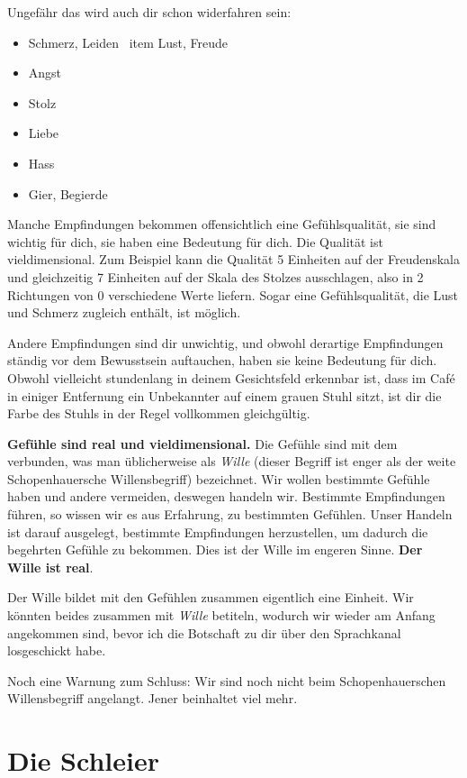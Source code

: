 \documentclass[12pt]{book}
\begin{document}
Ungefähr das wird auch dir schon widerfahren sein:
\begin{itemize}
\item Schmerz, Leiden
\	item Lust, Freude
\item Angst
\item Stolz
\item Liebe
\item Hass
\item Gier, Begierde
\end{itemize}

Manche Empfindungen bekommen offensichtlich eine Gefühlsqualität, sie sind wichtig für dich, sie haben eine Bedeutung für dich. Die Qualität ist vieldimensional. Zum Beispiel kann die Qualität 5 Einheiten auf der Freudenskala und gleichzeitig 7 Einheiten auf der Skala des Stolzes ausschlagen, also in 2 Richtungen von 0 verschiedene Werte liefern. Sogar eine Gefühlsqualität, die Lust und Schmerz zugleich enthält, ist möglich. 

Andere Empfindungen sind dir unwichtig, und obwohl derartige Empfindungen ständig vor dem Bewusstsein auftauchen, haben sie keine Bedeutung für dich. Obwohl vielleicht stundenlang in deinem Gesichtsfeld erkennbar ist, dass im Café in einiger Entfernung ein Unbekannter auf einem grauen Stuhl sitzt, ist dir die Farbe des Stuhls in der Regel vollkommen gleichgültig.

\textbf{Gefühle sind real und vieldimensional.} Die Gefühle sind mit dem verbunden, was man üblicherweise als \textit{Wille} (dieser Begriff ist enger als der weite Schopenhauersche Willensbegriff) bezeichnet. Wir wollen bestimmte Gefühle haben und andere vermeiden, deswegen handeln wir. Bestimmte Empfindungen führen, so wissen wir es aus Erfahrung, zu bestimmten Gefühlen. Unser Handeln ist darauf ausgelegt, bestimmte Empfindungen herzustellen, um dadurch die begehrten Gefühle zu bekommen. Dies ist der Wille im engeren Sinne. \textbf{Der Wille ist real}.

Der Wille bildet mit den Gefühlen zusammen eigentlich eine Einheit. Wir könnten beides zusammen mit \textit{Wille} betiteln, wodurch wir wieder am Anfang angekommen sind, bevor ich die Botschaft zu dir über den Sprachkanal losgeschickt habe.

Noch eine Warnung zum Schluss: Wir sind noch nicht beim Schopenhauerschen Willensbegriff angelangt. Jener beinhaltet viel mehr.   

\section{Die Schleier}
\end{document}
